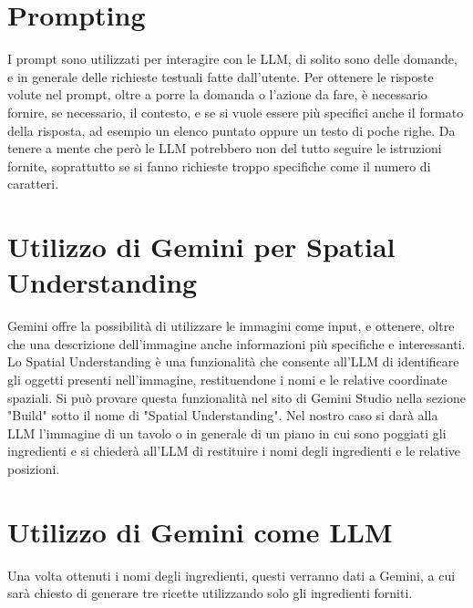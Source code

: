\section{Prompting}
I prompt sono utilizzati per interagire con le LLM, di solito sono delle domande, e in generale delle richieste testuali fatte dall'utente. Per ottenere le risposte volute nel prompt, oltre a porre la domanda o l'azione da fare, è necessario fornire, se necessario, il contesto, e se si vuole essere più specifici anche il formato della risposta, ad esempio un elenco puntato oppure un testo di poche righe. Da tenere a mente che però le LLM potrebbero non del tutto seguire le istruzioni fornite, soprattutto se si fanno richieste troppo specifiche come il numero di caratteri. \cite{PromptingNvidia} \cite{PromptingGoogle}

\section{Utilizzo di Gemini per Spatial Understanding}
Gemini offre la possibilità di utilizzare le immagini come input, e ottenere, oltre che una descrizione dell'immagine anche informazioni più specifiche e interessanti. Lo Spatial Understanding è una funzionalità che consente all'LLM di identificare gli oggetti presenti nell'immagine, restituendone i nomi e le relative coordinate spaziali. Si può provare questa funzionalità nel sito di Gemini Studio nella sezione "Build" sotto il nome di "Spatial Understanding". Nel nostro caso si darà alla LLM l'immagine di un tavolo o in generale di un piano in cui sono poggiati gli ingredienti e si chiederà all'LLM di restituire i nomi degli ingredienti e le relative posizioni.
\section{Utilizzo di Gemini come LLM}
Una volta ottenuti i nomi degli ingredienti, questi verranno dati a Gemini, a cui sarà chiesto di generare tre ricette utilizzando solo gli ingredienti forniti.

